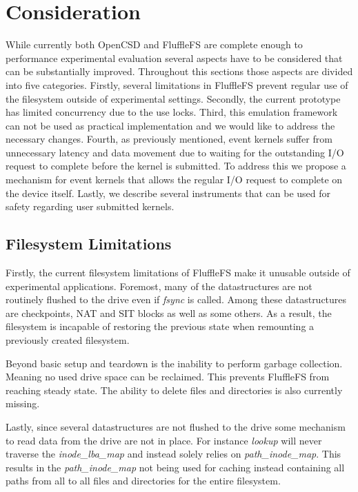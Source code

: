 \chapter{Consideration}

While currently both OpenCSD and FluffleFS are complete enough to performance
experimental evaluation several aspects have to be considered that can be
substantially improved. Throughout this sections those aspects are divided into
five categories. Firstly, several limitations in FluffleFS prevent regular use
of the filesystem outside of experimental settings. Secondly, the current
prototype has limited concurrency due to the use locks. Third, this emulation
framework can not be used as practical implementation and we would like to
address the necessary changes. Fourth, as previously mentioned, event kernels
suffer from unnecessary latency and data movement due to waiting for the
outstanding I/O request to complete before the kernel is submitted. To address
this we propose a mechanism for event kernels that allows the regular I/O
request to complete on the device itself. Lastly, we describe several
instruments that can be used for safety regarding user submitted kernels.

\section{Filesystem Limitations}

Firstly, the current filesystem limitations of FluffleFS make it unusable
outside of experimental applications. Foremost, many of the datastructures are
not routinely flushed to the drive even if \textit{fsync} is called. Among
these datastructures are checkpoints, NAT and SIT blocks as well as some others.
As a result, the filesystem is incapable of restoring the previous state when
remounting a previously created filesystem.

Beyond basic setup and teardown is the inability to perform garbage collection.
Meaning no used drive space can be reclaimed. This prevents FluffleFS from
reaching steady state. The ability to delete files and directories is also
currently missing.

Lastly, since several datastructures are not flushed to the drive some mechanism
to read data from the drive are not in place. For instance \textit{lookup} will
never traverse the \textit{inode\_lba\_map} and instead solely relies on
\textit{path\_inode\_map}. This results in the \textit{path\_inode\_map} not
being used for caching instead containing all paths from all to all files and
directories for the entire filesystem.

